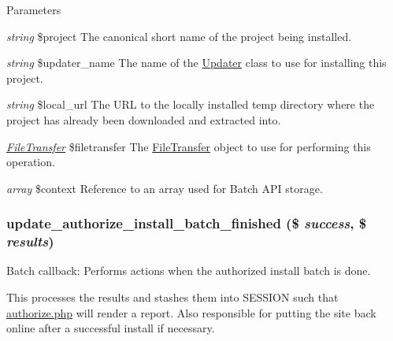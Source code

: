 \begin{DoxyParams}{Parameters}
\item[{\em string}]\$project The canonical short name of the project being installed. \item[{\em string}]\$updater\_\-name The name of the \hyperlink{classUpdater}{Updater} class to use for installing this project. \item[{\em string}]\$local\_\-url The URL to the locally installed temp directory where the project has already been downloaded and extracted into. \item[{\em \hyperlink{classFileTransfer}{FileTransfer}}]\$filetransfer The \hyperlink{classFileTransfer}{FileTransfer} object to use for performing this operation. \item[{\em array}]\$context Reference to an array used for Batch API storage. \end{DoxyParams}
\hypertarget{update_8authorize_8inc_a5fa685f8381c4bb3cd5e2a237e82e5a4}{
\subsubsection[{update\_\-authorize\_\-install\_\-batch\_\-finished}]{\setlength{\rightskip}{0pt plus 5cm}update\_\-authorize\_\-install\_\-batch\_\-finished (\$ {\em success}, \/  \$ {\em results})}}
\label{update_8authorize_8inc_a5fa685f8381c4bb3cd5e2a237e82e5a4}
Batch callback: Performs actions when the authorized install batch is done.

This processes the results and stashes them into SESSION such that \hyperlink{authorize_8php}{authorize.php} will render a report. Also responsible for putting the site back online after a successful install if necessary.


